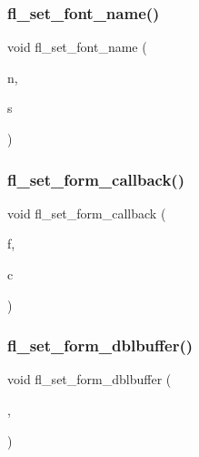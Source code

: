 \mbox{\label{forms_8_h_a941f48912a0c515e54d996a116cacbf5}} 
\subsubsection{\texorpdfstring{fl\+\_\+set\+\_\+font\+\_\+name()}{fl\_set\_font\_name()}}
{\footnotesize\ttfamily void fl\+\_\+set\+\_\+font\+\_\+name (\begin{DoxyParamCaption}\item[{\hyperlink{_enumerations_8_h_a2ac46d9f082834b969fffe490a03a709}{Fl\+\_\+\+Font}}]{n,  }\item[{const char $\ast$}]{s }\end{DoxyParamCaption})\hspace{0.3cm}{\ttfamily [inline]}}

\mbox{\label{forms_8_h_a967f084644d6c1d984d99b4f6d1ad388}} 
\subsubsection{\texorpdfstring{fl\+\_\+set\+\_\+form\+\_\+callback()}{fl\_set\_form\_callback()}}
{\footnotesize\ttfamily void fl\+\_\+set\+\_\+form\+\_\+callback (\begin{DoxyParamCaption}\item[{\hyperlink{class_fl___window}{Fl\+\_\+\+Window} $\ast$}]{f,  }\item[{\hyperlink{forms_8_h_ad97f38473f6f13b5ab389030a4c8887c}{Forms\+\_\+\+Form\+CB}}]{c }\end{DoxyParamCaption})\hspace{0.3cm}{\ttfamily [inline]}}

\mbox{\label{forms_8_h_a2ecd4278bcb8e352aa6083b7d68d0776}} 
\subsubsection{\texorpdfstring{fl\+\_\+set\+\_\+form\+\_\+dblbuffer()}{fl\_set\_form\_dblbuffer()}}
{\footnotesize\ttfamily void fl\+\_\+set\+\_\+form\+\_\+dblbuffer (\begin{DoxyParamCaption}\item[{\hyperlink{class_fl___window}{Fl\+\_\+\+Window} $\ast$}]{,  }\item[{int}]{ }\end{DoxyParamCaption})\hspace{0.3cm}{\ttfamily [inline]}}

